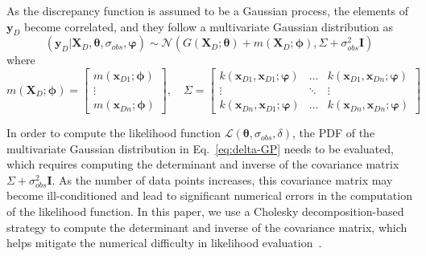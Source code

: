 \documentclass[preprint,review,12pt,3p]{elsarticle}
\begin{document}
As the discrepancy function is assumed to be a Gaussian process, the elements of $\boldsymbol{y}_D$ become correlated, and they follow a multivariate Gaussian distribution as
\begin{equation}\label{eq:delta-GP}
(\boldsymbol{y}_D | \boldsymbol{X}_D, \boldsymbol{\theta},\sigma_{obs},\boldsymbol{\varphi} ) \sim \mathcal{N}(G(\boldsymbol{X}_D; \boldsymbol{\theta})+m(\boldsymbol{X}_D;\boldsymbol{\phi}),\Sigma+\sigma_{obs}^2 \boldsymbol{I})
\end{equation}
where
\begin{equation}\label{eq:observation1}
m(\boldsymbol{X}_D;\boldsymbol{\phi}) =
\begin{bmatrix}
m(\boldsymbol{x}_{D1};\boldsymbol{\phi}) \\
\vdots \\
m(\boldsymbol{x}_{Dn};\boldsymbol{\phi}) 
\end{bmatrix}, \quad
\Sigma = 
\begin{bmatrix}
k(\boldsymbol{x}_{D1},\boldsymbol{x}_{D1};\boldsymbol{\varphi}) & \ldots & k(\boldsymbol{x}_{D1},\boldsymbol{x}_{Dn};\boldsymbol{\varphi}) \\
\vdots & \ddots &\vdots \\
k(\boldsymbol{x}_{Dn},\boldsymbol{x}_{D1};\boldsymbol{\varphi}) & \ldots & k(\boldsymbol{x}_{Dn},\boldsymbol{x}_{Dn};\boldsymbol{\varphi})
\end{bmatrix}
\end{equation}

In order to compute the likelihood function $\mathcal{L}(\boldsymbol{\theta},\sigma_{obs},\delta)$, the PDF of the multivariate Gaussian distribution in Eq.~\ref{eq:delta-GP} needs to be evaluated, which requires computing the determinant and inverse of the covariance matrix $\Sigma+\sigma_{obs}^2 \boldsymbol{I}$. As the number of data points increases, this covariance matrix may become ill-conditioned and lead to significant numerical errors in the computation of the likelihood function. In this paper, we use a Cholesky decomposition-based strategy to compute the determinant and inverse of the covariance matrix, which helps mitigate the numerical difficulty in likelihood evaluation~\citep{Haarhoff2013}.
\end{document}
